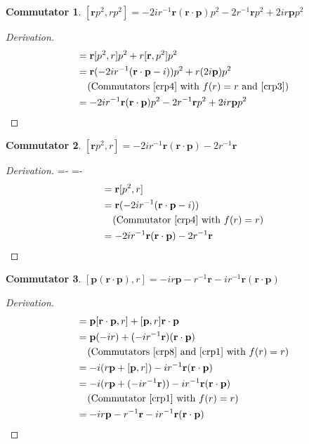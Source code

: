 \documentclass[12pt,a4paper]{report}
\theoremstyle{definition}
\newtheorem{commutator}{Commutator}[section]
\newenvironment{derivation}
  {\renewcommand\qedsymbol{$\square$}\begin{proof}[Derivation]}
  {\end{proof}}
\theoremstyle{remark}
\theoremstyle{remark}
\begin{document}
\begin{appendices}
\begin{commutator}\label{crp12}
$[\textbf{r}p^2,rp^2]=-2ir^{-1}\textbf{r}(\textbf{r}\cdot\textbf{p})p^2-2r^{-1}\textbf{r}p^2+2ir\textbf{p}p^2$
\end{commutator}
\begin{derivation}
\begin{align*}
[\textbf{r}p^2,rp^2]&=\textbf{r}[p^2,r]p^2+r[\textbf{r},p^2]p^2\\
&=\textbf{r}(-2ir^{-1}(\textbf{r}\cdot\textbf{p}-i))p^2+r(2i\textbf{p})p^2\\
&\phantom{=} \text{ (Commutators~\ref{crp4} with }f(r)=r\text{ and~\ref{crp3})}\\
&=-2ir^{-1}\textbf{r}(\textbf{r}\cdot\textbf{p})p^2-2r^{-1}\textbf{r}p^2+2ir\textbf{p}p^2
\end{align*}
\end{derivation}

\begin{commutator}\label{crp13}
$[\textbf{r}p^2,r]=-2ir^{-1}\textbf{r}(\textbf{r}\cdot\textbf{p})-2r^{-1}\textbf{r}$
\end{commutator}
\begin{derivation}
\abovedisplayskip=-\baselineskip
\belowdisplayskip=0pt
\abovedisplayshortskip=-\baselineskip
\belowdisplayshortskip=0pt
\begin{align*}
[\textbf{r}p^2,r]&=\textbf{r}[p^2,r]\\
&=\textbf{r}(-2ir^{-1}(\textbf{r}\cdot\textbf{p}-i))\\
&\phantom{=}\text{ (Commutator~\ref{crp4} with }f(r)=r)\\
&=-2ir^{-1}\textbf{r}(\textbf{r}\cdot\textbf{p})-2r^{-1}\textbf{r}
\end{align*}
\end{derivation}

\begin{commutator}\label{crp14}
$[\textbf{p}(\textbf{r}\cdot\textbf{p}),r]=-ir\textbf{p}-r^{-1}\textbf{r}-ir^{-1}\textbf{r}(\textbf{r}\cdot\textbf{p})$
\end{commutator}
\begin{derivation}
\begin{align*}
[\textbf{p}(\textbf{r}\cdot\textbf{p}),r]&=\textbf{p}[\textbf{r}\cdot\textbf{p},r]+[\textbf{p},r]\textbf{r}\cdot\textbf{p}\\
&=\textbf{p}(-ir)+(-ir^{-1}\textbf{r})(\textbf{r}\cdot\textbf{p})\\
&\phantom{=}\text{ (Commutators~\ref{crp8} and~\ref{crp1} with }f(r)=r)\\
&=-i(r\textbf{p}+[\textbf{p},r])-ir^{-1}\textbf{r}(\textbf{r}\cdot\textbf{p})\\
&=-i(r\textbf{p}+(-ir^{-1}\textbf{r}))-ir^{-1}\textbf{r}(\textbf{r}\cdot\textbf{p})\\
&\phantom{=}\text{ (Commutator~\ref{crp1} with }f(r)=r)\\
&=-ir\textbf{p}-r^{-1}\textbf{r}-ir^{-1}\textbf{r}(\textbf{r}\cdot\textbf{p})
\end{align*}
\end{derivation}


\end{appendices}
\end{document}

